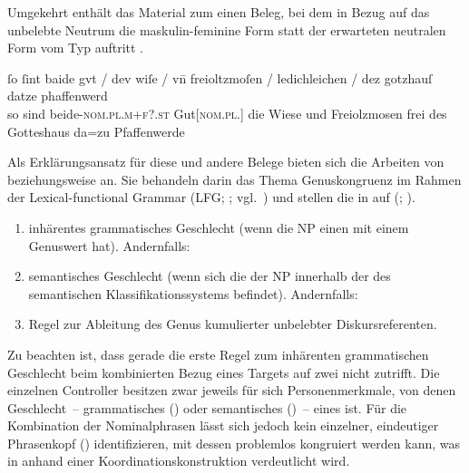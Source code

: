 Umgekehrt enthält das Material zum \CAO{} einen Beleg, bei dem in
Bezug auf das un\-belebte Neutrum   die maskulin-feminine
Form  statt der erwarteten neutralen Form vom Typ 
auftritt .

\begin{exe}
\ex\label{ex:1584_gut2}
	\gll ſo ſint baide gvt / dev wiſe / vn̄ freioltzmoſen /
			ledichleichen / dez gotzhauſ datze phaffenwerd \\
		so sind beide-\textsc{nom.pl.m+f?\subI.st} Gut[\textsc{nom.pl.\NeutI}]
			{} die Wiese {} und Freiolzmosen {} frei {} des Gotteshaus da=zu
			Pfaffenwerde \\
	\trans {}
		\parencites(Nr.~1584, Kl.~Herrenchiemsee, Kr.~Rosenheim, 1292)[727,26--27]{cao2}
\end{exe}

\begin{sloppypar}
Als Erklärungsansatz für diese und andere Belege bieten sich die Arbeiten von
\citet[171--195]{wechslerzlatic2003} beziehungsweise \citet{wechsler2009} an.
Sie behandeln darin das Thema Genus\-kongruenz im Rahmen der Lexical-functional
Grammar (LFG;
\cites{bresnanetal2016,dalrymple2023}; vgl.~) und stellen
die  in
 auf (;
\cites[195]{wechslerzlatic2003}[584]{wechsler2009}).
\end{sloppypar}

\begin{exe}
\ex\label{ex:gendasshier}
	\begin{enumerate}
		\item inhärentes grammatisches Geschlecht (wenn die
			NP einen  mit einem Genuswert
			hat). Andernfalls:
		\item semantisches Geschlecht (wenn sich die  der NP
			innerhalb der  des semantischen Klassifikationssystems
			befindet). Andernfalls:
		\item Regel zur Ableitung des Genus kumulierter
			unbelebter Diskursreferenten.
	\end{enumerate}
\end{exe}

Zu beachten ist, dass gerade die erste Regel zum inhärenten grammatischen
Geschlecht beim kombinierten Bezug eines Targets auf zwei
 nicht zutrifft. Die einzelnen Controller besitzen zwar jeweils
für sich Personenmerkmale, von denen Geschlecht~--
grammatisches () oder semantisches ()~-- eines ist. Für
die Kombination der Nominalphrasen lässt sich jedoch kein
einzelner, eindeutiger Phrasenkopf ()
identifizieren, mit dessen  problemlos
kongruiert werden kann, was in  anhand
einer Koordinations\-konstruktion verdeutlicht wird.

